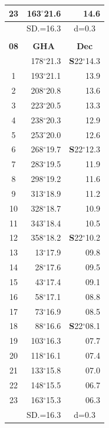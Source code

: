 \documentclass[10pt, a4paper]{report}
\begin{document}
\begin{scriptsize}
\begin{tabular*}{0.2\textwidth}[t]{@{\extracolsep{\fill}}|c|rr|}
23 & 163$^\circ$21.6 & 14.6\\
\hline
\rule{0pt}{2.4ex} & \multicolumn{1}{c}{SD.=16.3} & \multicolumn{1}{c|}{d=0.3}\\
\hline
\multicolumn{1}{c}{}\\[-0.5ex]\hline
\multicolumn{1}{|c|}{\rule{0pt}{2.6ex}\textbf{08}} & \multicolumn{1}{c}{\textbf{GHA}} & \multicolumn{1}{c|}{\textbf{Dec}}\\
\hline\rule{0pt}{2.6ex}\noindent
0 & 178$^\circ$21.3 & \textbf{S}22$^\circ$14.3\\
1 & 193$^\circ$21.1 & 13.9\\
2 & 208$^\circ$20.8 & 13.6\\
3 & 223$^\circ$20.5 & \raisebox{0.24ex}{\boldmath$\cdot$~\boldmath$\cdot$~~}13.3\\
4 & 238$^\circ$20.3 & 12.9\\
5 & 253$^\circ$20.0 & 12.6\\[2Pt]
6 & 268$^\circ$19.7 & \textbf{S}22$^\circ$12.3\\
7 & 283$^\circ$19.5 & 11.9\\
8 & 298$^\circ$19.2 & 11.6\\
9 & 313$^\circ$18.9 & \raisebox{0.24ex}{\boldmath$\cdot$~\boldmath$\cdot$~~}11.2\\
10 & 328$^\circ$18.7 & 10.9\\
11 & 343$^\circ$18.4 & 10.5\\[2Pt]
12 & 358$^\circ$18.2 & \textbf{S}22$^\circ$10.2\\
13 & 13$^\circ$17.9 & 09.8\\
14 & 28$^\circ$17.6 & 09.5\\
15 & 43$^\circ$17.4 & \raisebox{0.24ex}{\boldmath$\cdot$~\boldmath$\cdot$~~}09.1\\
16 & 58$^\circ$17.1 & 08.8\\
17 & 73$^\circ$16.9 & 08.5\\[2Pt]
18 & 88$^\circ$16.6 & \textbf{S}22$^\circ$08.1\\
19 & 103$^\circ$16.3 & 07.7\\
20 & 118$^\circ$16.1 & 07.4\\
21 & 133$^\circ$15.8 & \raisebox{0.24ex}{\boldmath$\cdot$~\boldmath$\cdot$~~}07.0\\
22 & 148$^\circ$15.5 & 06.7\\
23 & 163$^\circ$15.3 & 06.3\\
\hline
\rule{0pt}{2.4ex} & \multicolumn{1}{c}{SD.=16.3} & \multicolumn{1}{c|}{d=0.3}\\
\hline
\end{tabular*}\noindent

\end{scriptsize}
\end{document}
